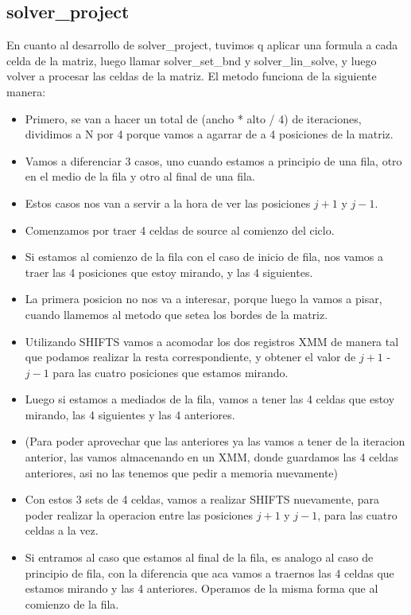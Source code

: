 \subsection{solver\_project}
En cuanto al desarrollo de solver\_project, tuvimos q aplicar una formula a cada celda de la matriz, luego llamar solver\_set\_bnd y solver\_lin\_solve, y luego volver a procesar las celdas de la matriz.
El metodo funciona de la siguiente manera:

\begin{itemize}
\item Primero, se van a hacer un total de (ancho * alto / 4) de iteraciones, dividimos a N por 4 porque vamos a agarrar de a 4 posiciones de la matriz.
\item Vamos a diferenciar 3 casos, uno cuando estamos a principio de una fila, otro en el medio de la fila y otro al final de una fila.
\item Estos casos nos van a servir a la hora de ver las posiciones $j+1$ y $j-1$.
\item Comenzamos por traer 4 celdas de source al comienzo del ciclo.
\item Si estamos al comienzo de la fila con el caso de inicio de fila, nos vamos a traer las 4 posiciones que estoy mirando, y las 4 siguientes.
\item La primera posicion no nos va a interesar, porque luego la vamos a pisar, cuando llamemos al metodo que setea los bordes de la matriz.
\item Utilizando SHIFTS vamos a acomodar los dos registros XMM de manera tal que podamos realizar la resta correspondiente, y obtener el valor de $j+1$ - $j-1$ para las cuatro posiciones que estamos mirando.
\item Luego si estamos a mediados de la fila, vamos a tener las 4 celdas que estoy mirando, las 4 siguientes y las 4 anteriores.
\item (Para poder aprovechar que las anteriores ya las vamos a tener de la iteracion anterior, las vamos almacenando en un XMM, donde guardamos las 4 celdas anteriores, asi no las tenemos que pedir a memoria nuevamente)
\item Con estos 3 sets de 4 celdas, vamos a realizar SHIFTS nuevamente, para poder realizar la operacion entre las posiciones $j+1$ y $j-1$, para las cuatro celdas a la vez.
\item Si entramos al caso que estamos al final de la fila, es analogo al caso de principio de fila, con la diferencia que aca vamos a traernos las 4 celdas que estamos mirando y las 4 anteriores. Operamos de la misma forma que al comienzo de la fila.

\end{itemize}
